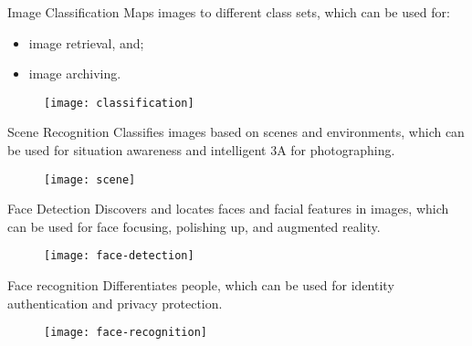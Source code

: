 \begin{frame}{Image Classification}
Maps images to different class sets, which can be used for:
\begin{itemize}
\item image retrieval, and;
\item image archiving.
\end{itemize}
\begin{figure}[!]
\centering
\texttt{[image: classification]}
\end{figure}
\end{frame}


\begin{frame}{Scene Recognition}
Classifies images based on scenes and environments, which can be used for situation awareness and intelligent 3A for photographing.
\begin{figure}[!]
\centering
\texttt{[image: scene]}
\end{figure}
\end{frame}


\begin{frame}{Face Detection}
Discovers and locates faces and facial features in images, which can be used for face focusing, polishing up, and augmented reality.
\begin{figure}[!]
\centering
\texttt{[image: face-detection]}
\end{figure}
\end{frame}

\begin{frame}{Face recognition}
Differentiates people, which can be used for identity authentication and privacy protection.
\begin{figure}[!]
\centering
\texttt{[image: face-recognition]}
\end{figure}
\end{frame}


